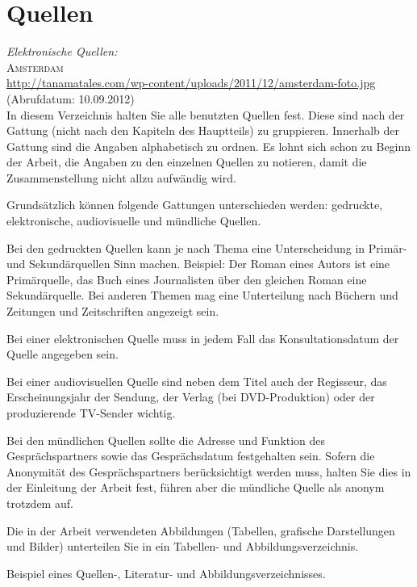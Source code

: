\part{Quellen}



\emph{Elektronische Quellen:}
\\ \textsc{Amsterdam} 
\\ \url{http://tanamatales.com/wp-content/uploads/2011/12/amsterdam-foto.jpg}
\\(Abrufdatum: 10.09.2012)
\\[0.4cm]
In diesem Verzeichnis halten Sie alle benutzten Quellen fest. Diese sind nach der Gattung (nicht nach den Kapiteln des Hauptteils) zu gruppieren. Innerhalb der Gattung sind die Angaben alphabetisch zu ordnen. Es lohnt sich schon zu Beginn der Arbeit, die Angaben zu den einzelnen Quellen zu notieren, damit die Zusammenstellung nicht allzu aufwändig wird. 

Grundsätzlich können folgende Gattungen unterschieden werden: gedruckte, elektronische, audiovisuelle und mündliche Quellen. 

Bei den gedruckten Quellen kann je nach Thema eine Unterscheidung in Primär- und Sekundärquellen Sinn machen. Beispiel: Der Roman eines Autors ist eine Primärquelle, das Buch eines Journalisten über den gleichen Roman eine Sekundärquelle. Bei anderen Themen mag eine Unterteilung nach Büchern und Zeitungen und Zeitschriften angezeigt sein. 

Bei einer elektronischen Quelle muss in jedem Fall das Konsultationsdatum der Quelle angegeben sein. 

Bei einer audiovisuellen Quelle sind neben dem Titel auch der Regisseur, das Erscheinungsjahr der Sendung, der Verlag (bei DVD-Produktion) oder der produzierende TV-Sender wichtig. 

Bei den mündlichen Quellen sollte die Adresse und Funktion des Gesprächspartners sowie das Gesprächsdatum festgehalten sein. Sofern die Anonymität des Gesprächspartners berücksichtigt werden muss, halten Sie dies in der Einleitung der Arbeit fest, führen aber die mündliche Quelle als anonym trotzdem auf. 

Die in der Arbeit verwendeten Abbildungen (Tabellen, grafische Darstellungen und Bilder) unterteilen Sie in ein Tabellen- und Abbildungsverzeichnis. 

Beispiel eines Quellen-, Literatur- und Abbildungsverzeichnisses.
